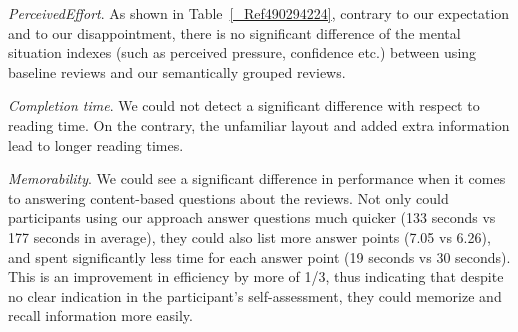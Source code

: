 \documentclass[runningheads,a4paper]{llncs}
\begin{document}
{\em Perceived}{\em Effort}. As shown in Table~\ref{_Ref490294224}, contrary to our expectation and to our disappointment, there is no significant difference of the mental situation indexes (such as perceived pressure, confidence etc.) between using baseline reviews and our semantically grouped reviews.

{\em Completion time}. We could not detect a significant difference with respect to reading time. On the contrary, the unfamiliar layout and added extra information lead to longer reading times.

{\em Memorability}. We could see a significant difference in performance when it comes to answering content-based questions about the reviews. Not only could participants using our approach answer questions much quicker (133 seconds vs 177 seconds in average), they could also list more answer points (7.05 vs 6.26), and spent significantly less time for each answer point (19 seconds vs 30 seconds). This is an improvement in efficiency by more of 1/3, thus indicating that despite no clear indication in the participant's self-assessment, they could memorize and recall information more easily.
\end{document}
